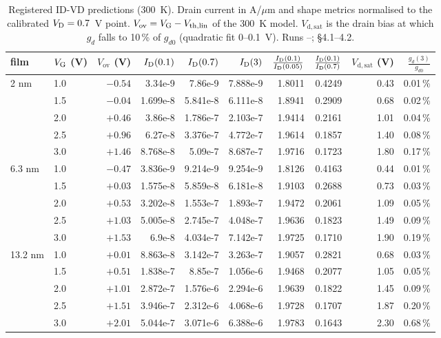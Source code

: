 \begin{table}[tbp]
  \centering
  \footnotesize
  \caption{Registered ID-VD predictions (300~K). Drain current in A/$\mu$m and shape metrics normalised to the calibrated $V_{\mathrm{D}} = 0.7$~V point. $V_{\mathrm{ov}} = V_{\mathrm{G}} - V_{\mathrm{th,lin}}$ of the 300~K model. $V_{\mathrm{d,sat}}$ is the drain bias at which $g_d$ falls to 10\,\% of $g_{d0}$ (quadratic fit 0--0.1~V). Runs --;  \S 4.1--4.2.}
  \label{tab:pred-idvd}
  \setlength{\tabcolsep}{3pt}
  \begin{tabular}{llrrrrrrrr}
    \toprule
    film & $V_{\mathrm{G}}$ (V) & $V_{\mathrm{ov}}$ (V) & $I_{\mathrm{D}}(0.1)$ & $I_{\mathrm{D}}(0.7)$ & $I_{\mathrm{D}}(3)$ & $\frac{I_{\mathrm{D}}(0.1)}{I_{\mathrm{D}}(0.05)}$ & $\frac{I_{\mathrm{D}}(0.1)}{I_{\mathrm{D}}(0.7)}$ & $V_{\mathrm{d,sat}}$ (V) & $\frac{g_d(3)}{g_{d0}}$ \\
    \midrule
    2 nm & 1.0 & $-0.54$ & 3.34e-9 & 7.86e-9 & 7.888e-9 & 1.8011 & 0.4249 & 0.43 & 0.01\,\% \\
         & 1.5 & $-0.04$ & 1.699e-8 & 5.841e-8 & 6.111e-8 & 1.8941 & 0.2909 & 0.68 & 0.02\,\% \\
         & 2.0 & $+0.46$ & 3.86e-8 & 1.786e-7 & 2.103e-7 & 1.9414 & 0.2161 & 1.01 & 0.04\,\% \\
         & 2.5 & $+0.96$ & 6.27e-8 & 3.376e-7 & 4.772e-7 & 1.9614 & 0.1857 & 1.40 & 0.08\,\% \\
         & 3.0 & $+1.46$ & 8.768e-8 & 5.09e-7 & 8.687e-7 & 1.9716 & 0.1723 & 1.80 & 0.17\,\% \\
    \midrule
    6.3 nm & 1.0 & $-0.47$ & 3.836e-9 & 9.214e-9 & 9.254e-9 & 1.8126 & 0.4163 & 0.44 & 0.01\,\% \\
         & 1.5 & $+0.03$ & 1.575e-8 & 5.859e-8 & 6.181e-8 & 1.9103 & 0.2688 & 0.73 & 0.03\,\% \\
         & 2.0 & $+0.53$ & 3.202e-8 & 1.553e-7 & 1.893e-7 & 1.9472 & 0.2061 & 1.09 & 0.05\,\% \\
         & 2.5 & $+1.03$ & 5.005e-8 & 2.745e-7 & 4.048e-7 & 1.9636 & 0.1823 & 1.49 & 0.09\,\% \\
         & 3.0 & $+1.53$ & 6.9e-8 & 4.034e-7 & 7.142e-7 & 1.9725 & 0.1710 & 1.90 & 0.19\,\% \\
    \midrule
    13.2 nm & 1.0 & $+0.01$ & 8.863e-8 & 3.142e-7 & 3.263e-7 & 1.9057 & 0.2821 & 0.68 & 0.03\,\% \\
         & 1.5 & $+0.51$ & 1.838e-7 & 8.85e-7 & 1.056e-6 & 1.9468 & 0.2077 & 1.05 & 0.05\,\% \\
         & 2.0 & $+1.01$ & 2.872e-7 & 1.576e-6 & 2.294e-6 & 1.9639 & 0.1822 & 1.45 & 0.09\,\% \\
         & 2.5 & $+1.51$ & 3.946e-7 & 2.312e-6 & 4.068e-6 & 1.9728 & 0.1707 & 1.87 & 0.20\,\% \\
         & 3.0 & $+2.01$ & 5.044e-7 & 3.071e-6 & 6.388e-6 & 1.9783 & 0.1643 & 2.30 & 0.68\,\% \\
    \bottomrule
  \end{tabular}
\end{table}

